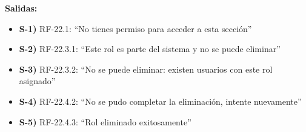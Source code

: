 \textbf{Salidas:}
\begin{itemize}[label={}, leftmargin=1.5em]
  \item \textbf{S-1)} RF-22.1: ``No tienes permiso para acceder a esta secci\'on''
  \item \textbf{S-2)} RF-22.3.1: ``Este rol es parte del sistema y no se puede eliminar''
  \item \textbf{S-3)} RF-22.3.2: ``No se puede eliminar: existen usuarios con este rol asignado''
  \item \textbf{S-4)} RF-22.4.2: ``No se pudo completar la eliminaci\'on, intente nuevamente''
  \item \textbf{S-5)} RF-22.4.3: ``Rol eliminado exitosamente''
\end{itemize}
